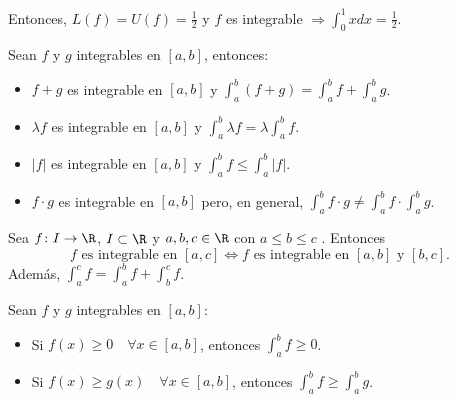 \begin{example}
	Entonces, \(L(f) = U(f) = \frac{1}{2}\) y \(f \) es integrable \(\Rightarrow \int^{1}_{0} x dx = \frac{1}{2} \).
	
	\begin{figure}[H]
		\centering
	\end{figure}
\end{example}

\begin{proposition}
	Sean \(f \) y \(g \) integrables en \([a,b ]\), entonces: 
	\begin{itemize}
		\item \(f + g \) es integrable en \([a,b ]\) y \(\int^{b}_a (f + g) = \int^{b}_a f + \int^{b}_a g \).
		\item \(\lambda f \) es integrable en \([a,b ]\) y \(\int^{b}_a \lambda f = \lambda \int^{b}_a f\).
		\item \(\left\vert f  \right\vert \) es integrable en \([a,b ]\) y \(\int^{b}_a f \leq \int^{b}_a \left\vert f  \right\vert . \)
		\item \(f \cdot g \) es integrable en \([a,b ]\) pero, en general, \(\int^{b}_a f \cdot g \neq \int^{b}_a f \cdot \int^{b}_a g\).
	\end{itemize}
\end{proposition}
\begin{proposition}
	Sea \(f\colon I \to \R\), \(I \subset \R\) y \(a,b,c \in \R\) con \(a \leq  b \leq  c\) . Entonces 
	\[
		f \text{ es integrable en } [a,c] \iff f \text{ es integrable en } [a,b] \text{ y } [b,c].  
	\]
	Además, \(\int^{c}_a f = \int^{b}_{a} f + \int^{c}_b f\).  
\end{proposition}
\begin{proposition}
	Sean \(f \) y \(g \) integrables en \([a,b ]\): 
	\begin{itemize}
		\item Si \(f(x) \geq 0 \quad  \forall x \in [a,b]\), entonces \(\int^{b}_a f \geq 0\).
		\item Si \(f(x) \geq g(x) \quad \forall x \in [a,b]\), entonces \(\int^{b}_a f \geq \int^{b}_a g\).
	\end{itemize}
\end{proposition}
